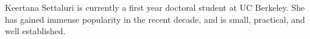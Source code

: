 \documentclass[journal]{IEEEtran}
\begin{document}
\begin{IEEEbiography}{Keertana Settaluri}
is currently a first year doctoral student at UC Berkeley. She has gained immense popularity in the recent decade, and is small, practical, and well established. 
\end{IEEEbiography}






\end{document}
